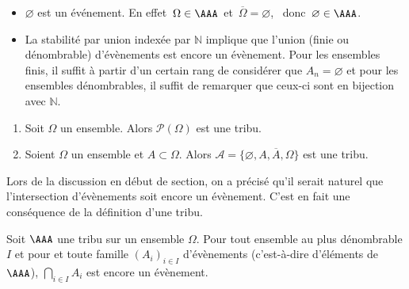 \documentclass[french,11pt,twoside]{VcCours}
\begin{document}
\begin{Remarques}{}
\begin{itemize}
\item $\varnothing$ est un événement. En effet $\,\Omega \in\AAA\,$ et $\,\overline{\Omega} = \varnothing$, \ donc $\,\varnothing\in\AAA$.
\item La stabilité par union indexée par $\mathbb{N}$ implique que l'union 
(finie ou dénombrable) d'évènements est encore un évènement. 
Pour les ensembles finis, il suffit à partir d'un certain rang de considérer 
que $A_n = \varnothing$ et pour les ensembles dénombrables, il suffit de 
remarquer que ceux-ci sont en bijection avec $\mathbb{N}$.
\end{itemize}
\end{Remarques}


\begin{Exemples}
\begin{enumerate}
\item Soit $\Omega$ un ensemble. Alors $\mathcal{P}(\Omega)$ est une tribu.
\item Soient $\Omega$ un ensemble et $A \subset \Omega$. Alors $\mathcal{A} = \lbrace \varnothing, A, \overline{A}, \Omega \rbrace$ est une tribu. 
\end{enumerate}
\end{Exemples}



Lors de la discussion en début de section, on a précisé qu'il serait naturel que l'intersection d'évènements soit encore un évènement. C'est en fait une conséquence de la définition d'une tribu.




\begin{Proposition}{}
Soit $\AAA$ une tribu sur un ensemble $\Omega$. Pour tout ensemble au plus dénombrable $I$ et pour et toute famille $(A_i)_{i \in I}$ d'évènements (c'est-à-dire d'éléments de $\AAA$), $\bigcap_{i \in I} A_i$ est encore un évènement.
\end{Proposition}

\begin{Demonstration}{} 

\vspace{6cm}
%
\end{Demonstration}
%
\end{document}
